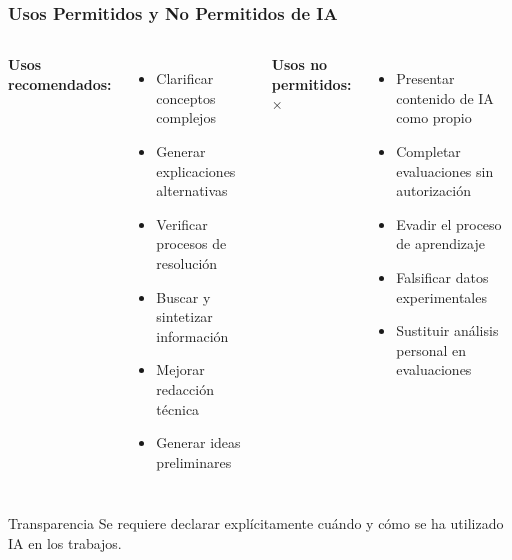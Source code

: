 \documentclass{beamer}
\begin{document}
\begin{frame}
    \frametitle{Usos Permitidos y No Permitidos de IA}
    
    \begin{columns}[t]
        \textbf{Usos recomendados:} {\color{darkgreen}\checkmark}
        \begin{itemize}
            \item Clarificar conceptos complejos
            \item Generar explicaciones alternativas
            \item Verificar procesos de resolución
            \item Buscar y sintetizar información
            \item Mejorar redacción técnica
            \item Generar ideas preliminares
        \end{itemize}
        
        \textbf{Usos no permitidos:} {\color{red}\textsf{×}}
        \begin{itemize}
            \item Presentar contenido de IA como propio
            \item Completar evaluaciones sin autorización
            \item Evadir el proceso de aprendizaje
            \item Falsificar datos experimentales
            \item Sustituir análisis personal en evaluaciones
        \end{itemize}
    \end{columns}
    
    \vspace{0.5cm}
    \begin{alertblock}{Transparencia}
        Se requiere declarar explícitamente cuándo y cómo se ha utilizado IA en los trabajos.
    \end{alertblock}
\end{frame}
\end{document}

